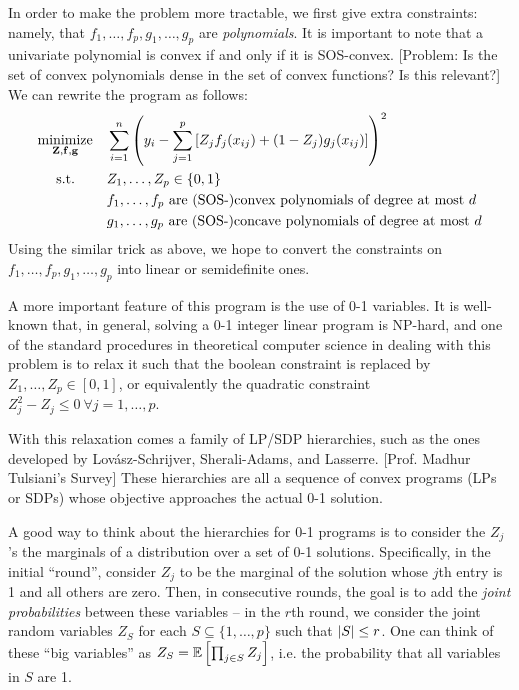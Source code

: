 \documentclass[11pt]{article}
\begin{document}
In order to make the problem more tractable, we first give extra constraints: namely, that $f_1, \dotsc, f_p, g_1, \dotsc, g_p$ are \emph{polynomials}. It is important to note that a univariate polynomial is convex if and only if it is SOS-convex. [Problem: Is the set of convex polynomials dense in the set of convex functions? Is this relevant?] We can rewrite the program as follows:
\begin{equation}\label{cvx-pattern2}
\begin{aligned}
& \underset{{\bf Z}, {\bf f}, {\bf g}}{\text{minimize}}
& & \sum_{i=1}^n \left(y_i - \sum_{j=1}^p\left[Z_jf_j(x_{ij}) + (1-Z_j)g_j(x_{ij})\right]\right)^2 \\
& \text{\quad\ s.t.}
& & Z_1, \dotsc, Z_p \in \{0,1\} \\
& & & f_1, \dotsc, f_p \text{ are (SOS-)convex polynomials of degree at most $d$} \\
& & & g_1, \dotsc, g_p \text{ are (SOS-)concave polynomials of degree at most $d$} 
\end{aligned}
\end{equation}
Using the similar trick as above, we hope to convert the constraints on $f_1, \dotsc, f_p, g_1, \dotsc, g_p$ into linear or semidefinite ones. 

A more important feature of this program is the use of 0-1 variables. It is well-known that, in general, solving a 0-1 integer linear program is NP-hard, and one of the standard procedures in theoretical computer science in dealing with this problem is to relax it such that the boolean constraint is replaced by $Z_1, \dotsc, Z_p \in [0,1]$, or equivalently the quadratic constraint $Z_j^2 - Z_j \leq 0\ \forall j=1, \dotsc, p$.

With this relaxation comes a family of LP/SDP hierarchies, such as the ones developed by Lov\'asz-Schrijver, Sherali-Adams, and Lasserre. [Prof. Madhur Tulsiani's Survey] These hierarchies are all a sequence of convex programs (LPs or SDPs) whose objective approaches the actual 0-1 solution. 

A good way to think about the hierarchies for 0-1 programs is to consider the $Z_j$'s the marginals of a distribution over a set of 0-1 solutions. Specifically, in the initial ``round'', consider $Z_j$ to be the marginal of the solution whose $j$th entry is 1 and all others are zero. Then, in consecutive rounds, the goal is to add the \emph{joint probabilities} between these variables -- in the $r$th round, we consider the joint random variables $Z_S$ for each $S \subseteq \{1, \dotsc, p\}$ such that $\left\lvert S \right\rvert \leq r$. One can think of these ``big variables'' as $Z_S = \operatorname*{\mathbb{E}}\left[{\prod_{j \in S} Z_j}\right]$, i.e. the probability that all variables in $S$ are 1.
\end{document}
